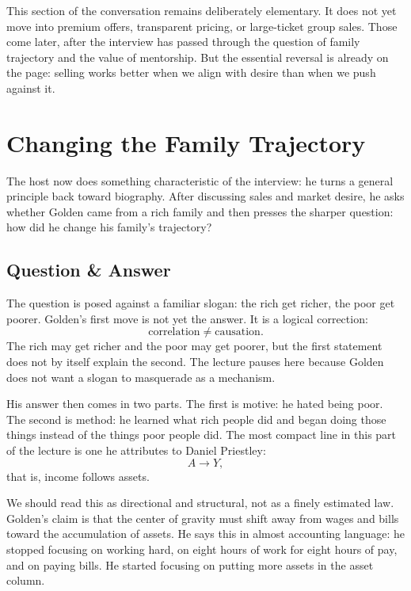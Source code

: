 This section of the conversation remains deliberately elementary. It does not yet move into premium offers, transparent pricing, or large-ticket group sales. Those come later, after the interview has passed through the question of family trajectory and the value of mentorship. But the essential reversal is already on the page: selling works better when we align with desire than when we push against it.

\section{Changing the Family Trajectory}

The host now does something characteristic of the interview: he turns a general principle back toward biography. After discussing sales and market desire, he asks whether Golden came from a rich family and then presses the sharper question: how did he change his family's trajectory?

\subsection{Question \& Answer}

The question is posed against a familiar slogan: the rich get richer, the poor get poorer. Golden's first move is not yet the answer. It is a logical correction:
\begin{equation}
\text{correlation} \neq \text{causation}.
\end{equation}
The rich may get richer and the poor may get poorer, but the first statement does not by itself explain the second. The lecture pauses here because Golden does not want a slogan to masquerade as a mechanism.

His answer then comes in two parts. The first is motive: he hated being poor. The second is method: he learned what rich people did and began doing those things instead of the things poor people did. The most compact line in this part of the lecture is one he attributes to Daniel Priestley:
\begin{equation}
A \rightarrow Y,
\end{equation}
that is, income follows assets.

We should read this as directional and structural, not as a finely estimated law. Golden's claim is that the center of gravity must shift away from wages and bills toward the accumulation of assets. He says this in almost accounting language: he stopped focusing on working hard, on eight hours of work for eight hours of pay, and on paying bills. He started focusing on putting more assets in the asset column.

